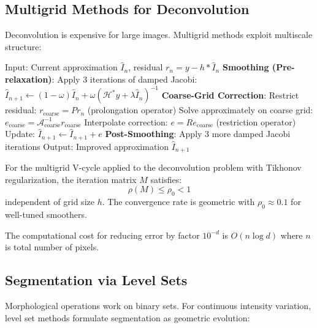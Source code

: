 \documentclass[twocolumn,11pt]{article}
\begin{document}
\subsection{Multigrid Methods for Deconvolution}

Deconvolution is expensive for large images. Multigrid methods exploit multiscale structure:

\begin{algorithm}
\caption{Multigrid V-Cycle for Deconvolution}
\begin{algorithmic}[1]
\State Input: Current approximation $\hat{I}_n$, residual $r_n = y - h * \hat{I}_n$
\State \textbf{Smoothing (Pre-relaxation)}:
  \State \quad Apply 3 iterations of damped Jacobi: $\hat{I}_{n+1} \leftarrow (1-\omega)\hat{I}_n + \omega (\mathcal{H}^* y + \lambda \hat{I}_n)^{-1}$
\State \textbf{Coarse-Grid Correction}:
  \State \quad Restrict residual: $r_{\text{coarse}} = P r_n$ (prolongation operator)
  \State \quad Solve approximately on coarse grid: $e_{\text{coarse}} = \mathcal{A}_{\text{coarse}}^{-1} r_{\text{coarse}}$
  \State \quad Interpolate correction: $e = R e_{\text{coarse}}$ (restriction operator)
  \State \quad Update: $\hat{I}_{n+1} \leftarrow \hat{I}_{n+1} + e$
\State \textbf{Post-Smoothing}:
  \State \quad Apply 3 more damped Jacobi iterations
\State Output: Improved approximation $\hat{I}_{n+1}$
\end{algorithmic}
\end{algorithm}

\begin{theorem}
For the multigrid V-cycle applied to the deconvolution problem with Tikhonov regularization, the iteration matrix $M$ satisfies:
\begin{equation}
\rho(M) \leq \rho_0 < 1
\end{equation}
independent of grid size $h$. The convergence rate is geometric with $\rho_0 \approx 0.1$ for well-tuned smoothers.

The computational cost for reducing error by factor $10^{-d}$ is $O(n \log d)$ where $n$ is total number of pixels.
\end{theorem}

\subsection{Segmentation via Level Sets}

Morphological operations work on binary sets. For continuous intensity variation, level set methods formulate segmentation as geometric evolution:
\end{document}
